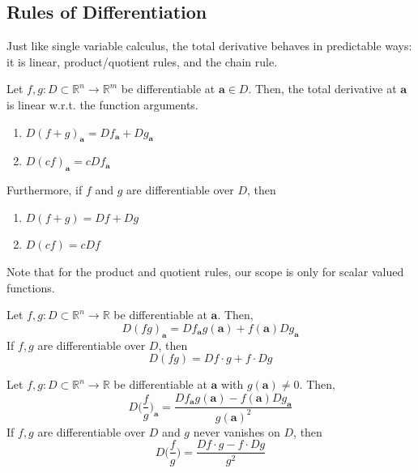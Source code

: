 \subsection{Rules of Differentiation}

  Just like single variable calculus, the total derivative behaves in predictable ways: it is linear, product/quotient rules, and the chain rule. 

  \begin{theorem}
    Let $f, g: D \subset \mathbb{R}^n \longrightarrow \mathbb{R}^m$ be differentiable at $\mathbf{a} \in D$. Then, the total derivative at $\mathbf{a}$ is linear w.r.t. the function arguments. 
    \begin{enumerate}
      \item $D (f + g)_\mathbf{a} = D f_\mathbf{a} + D g_\mathbf{a}$ 
      \item $D (c f)_\mathbf{a} = c D f_\mathbf{a}$ 
    \end{enumerate}
    Furthermore, if $f$ and $g$ are differentiable over $D$, then 
    \begin{enumerate}
      \item $D (f + g) = D f + D g$ 
      \item $D (c f) = c D f$
    \end{enumerate}
  \end{theorem}

  Note that for the product and quotient rules, our scope is only for scalar valued functions. 

  \begin{theorem}
    Let $f, g: D \subset \mathbb{R}^n \longrightarrow \mathbb{R}$ be differentiable at $\mathbf{a}$. Then, 
    \begin{equation}
    D (f g)_\mathbf{a} = D f_\mathbf{a} g(\mathbf{a}) + f(\mathbf{a}) D g_\mathbf{a}
    \end{equation}
    If $f, g$ are differentiable over $D$, then 
    \[D (f g) = D f \cdot g + f \cdot D g\]
  \end{theorem}

  \begin{theorem}
  Let $f, g: D \subset \mathbb{R}^n \longrightarrow \mathbb{R}$ be differentiable at $\mathbf{a}$ with $g(\mathbf{a}) \neq 0$. Then, 
  \[D \Big( \frac{f}{g} \Big)_\mathbf{a} = \frac{D f_\mathbf{a} g(\mathbf{a}) - f(\mathbf{a}) D g_\mathbf{a}}{g(\mathbf{a})^2}\]
  If $f, g$ are differentiable over $D$ and $g$ never vanishes on $D$, then 
  \[D \Big( \frac{f}{g} \Big) = \frac{D f \cdot g - f \cdot D g}{g^2}\]
  \end{theorem}

